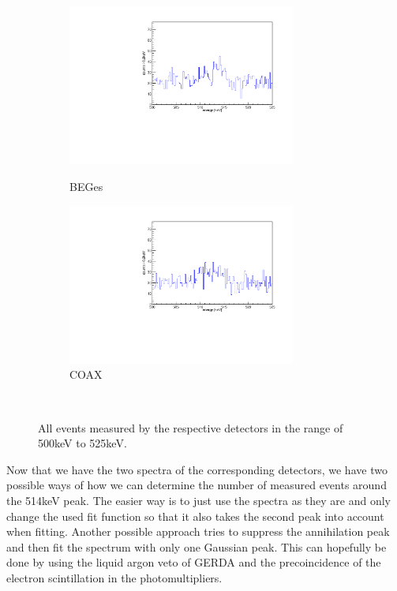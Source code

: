 \documentclass[encoding=utf8,british]{tumphthesis}
\begin{document}
\begin{figure}[t!]
\centering
\begin{subfigure}{.5\textwidth}
  \centering
	\includegraphics[width=75mm]{./Bilder/500525NoFilterBEGes.pdf}
  \label{fig:NoFilterBEGes}
  \caption{BEGes}
\end{subfigure}%
\begin{subfigure}{.5\textwidth}
  \centering
	\includegraphics[width=75mm]{./Bilder/500525NoFilterCOAX.pdf}
  \caption{COAX}
  \label{fig:NoFilterCOAX}
\end{subfigure}
    \\
	\vspace{0.5cm}
	\caption{All events measured by the respective detectors in the range of 500keV to 525keV.}
\end{figure}

Now that we have the two spectra of the corresponding detectors, we have two possible ways of how we can determine the number of measured events around the 514keV peak.
The easier way is to just use the spectra as they are and only change the used fit function so that it also takes the second peak into account when fitting.
Another possible approach tries to suppress the annihilation peak and then fit the spectrum with only one Gaussian peak.
This can hopefully be done by using the liquid argon veto of GERDA and the precoincidence of the electron scintillation in the photomultipliers. 
\\ 
\end{document}
